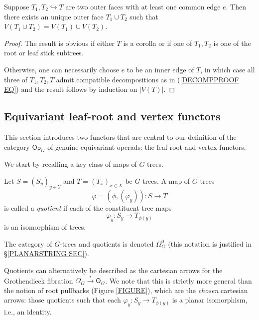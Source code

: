 \documentclass[a4paper,10pt]{article}%
\begin{document}
\begin{lemma}\label{OUTERFACEUNION LEM}
	Suppose $T_1,T_2 \hookrightarrow T$ are two outer faces with at least one common edge $e$. Then there exists an unique outer face $T_1 \cup T_2$ such that 
	$V(T_1 \cup T_2) = V(T_1) \cup V(T_2)$.
\end{lemma}

\begin{proof}
	The result is obvious if either
	$T$ is a corolla or if one of $T_1,T_2$
	is one of the root or leaf stick subtrees.

	Otherwise, one can necessarily choose $e$ to be an inner edge of $T$, in which case all three of $T_1,T_2,T$ admit compatible decompositions as in (\ref{DECOMPPROOF EQ}) and the result follows by induction on $|V(T)|$.
\end{proof}



\subsection{Equivariant leaf-root and vertex functors}\label{LRVERT SEC}


This section introduces two functors that are central to our definition of the category $\mathsf{Op}_G$ of
genuine equivariant operads: the leaf-root and vertex functors.

We start by recalling a key class of maps of $G$-trees.


\begin{definition}\label{QUOT DEF}
	Let $S = (S_y)_{y \in Y}$ and $T = (T_x)_{x \in X}$
	be $G$-trees.
	A map of $G$-trees 
	\[
	\varphi = (\phi, (\varphi_y))\colon S \to T
	\]
	is called a \textit{quotient} if each of the constituent tree maps
	\[
	\varphi_y \colon S_y \to T_{\phi(y)}
	\]
is an isomorphism of trees.	

The category of $G$-trees and quotients is denoted $\Omega_{G}^0$ (this notation is justified in \S \ref{PLANARSTRING SEC}).
\end{definition}


\begin{remark}
	Quotients can alternatively be described as the cartesian arrows for the Grothendieck fibration
	$\Omega_G \xrightarrow{\mathsf{r}} \mathsf{O}_G$.
	We note that this is strictly more general than the notion of root pullbacks (Figure \ref{FIGURE}), which are the \textit{chosen} cartesian arrows: those quotients such that each
	$\varphi_y \colon S_y \to T_{\phi(y)}$
	is a planar isomorphism, i.e., an identity.
\end{remark}
\end{document}
